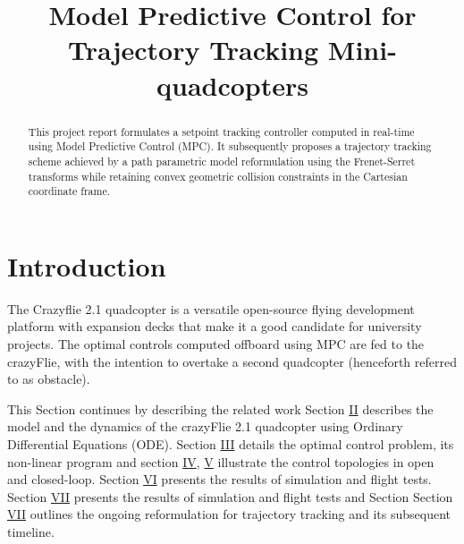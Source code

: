 \documentclass[conference]{IEEEtran}
\begin{document}
\title{Model Predictive Control for Trajectory Tracking Mini-quadcopters\\}
\author{
}

\maketitle

\begin{abstract}
This project report formulates a setpoint tracking controller computed in real-time using Model Predictive Control (MPC). It subsequently proposes a trajectory tracking scheme achieved by a path parametric model reformulation using the Frenet-Serret transforms while retaining convex geometric collision constraints in the Cartesian coordinate frame.

\end{abstract}

\section{Introduction}\label{Introduction}
The Crazyflie 2.1 quadcopter is a versatile open-source flying development platform with expansion decks that make it a good candidate for university projects. The optimal controls computed offboard using MPC are fed to the crazyFlie, with the intention to overtake a second quadcopter (henceforth referred to as obstacle).

This Section continues by describing the related work Section \hyperref[Section2]{II} describes the model and the dynamics of the crazyFlie 2.1 quadcopter using Ordinary Differential Equations (ODE). Section \hyperref[Section3]{III} details the optimal control problem, its non-linear program and section \hyperref[Section4]{IV}, \hyperref[Section5]{V} illustrate the control topologies in open and closed-loop. Section \hyperref[Section6]{VI} presents the results of simulation and flight tests. Section \hyperref[Section7]{VII} presents the results of simulation and flight tests and Section Section \hyperref[7]{VII} outlines the ongoing reformulation for trajectory tracking and its subsequent timeline. 
\end{document}
